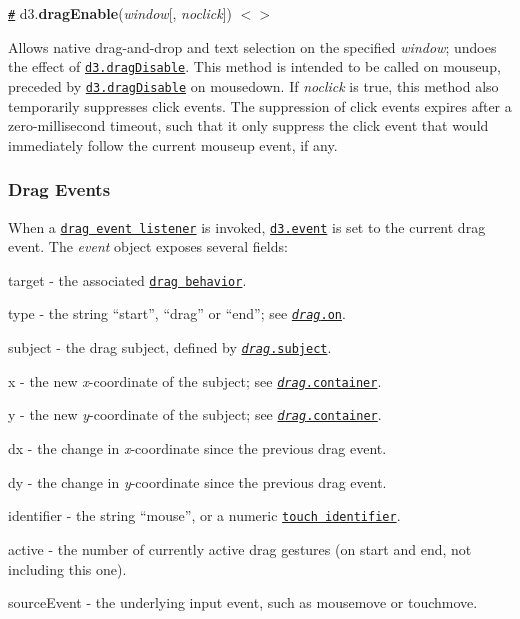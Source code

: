 \href{#dragEnable}{\tt \#} d3.{\bfseries drag\+Enable}({\itshape window}\mbox{[}, {\itshape noclick}\mbox{]}) \href{https://github.com/d3/d3-drag/blob/master/src/nodrag.js#L15}{\tt $<$$>$}

Allows native drag-\/and-\/drop and text selection on the specified {\itshape window}; undoes the effect of \href{#dragDisable}{\tt d3.\+drag\+Disable}. This method is intended to be called on mouseup, preceded by \href{#dragDisable}{\tt d3.\+drag\+Disable} on mousedown. If {\itshape noclick} is true, this method also temporarily suppresses click events. The suppression of click events expires after a zero-\/millisecond timeout, such that it only suppress the click event that would immediately follow the current mouseup event, if any.

\subsubsection*{Drag Events}

When a \href{#drag_on}{\tt drag event listener} is invoked, \href{https://github.com/d3/d3-selection#event}{\tt d3.\+event} is set to the current drag event. The {\itshape event} object exposes several fields\+:


\begin{DoxyItemize}
\item {\ttfamily target} -\/ the associated \href{#drag}{\tt drag behavior}.
\item {\ttfamily type} -\/ the string “start”, “drag” or “end”; see \href{#drag_on}{\tt {\itshape drag}.on}.
\item {\ttfamily subject} -\/ the drag subject, defined by \href{#drag_subject}{\tt {\itshape drag}.subject}.
\item {\ttfamily x} -\/ the new {\itshape x}-\/coordinate of the subject; see \href{#drag_container}{\tt {\itshape drag}.container}.
\item {\ttfamily y} -\/ the new {\itshape y}-\/coordinate of the subject; see \href{#drag_container}{\tt {\itshape drag}.container}.
\item {\ttfamily dx} -\/ the change in {\itshape x}-\/coordinate since the previous drag event.
\item {\ttfamily dy} -\/ the change in {\itshape y}-\/coordinate since the previous drag event.
\item {\ttfamily identifier} -\/ the string “mouse”, or a numeric \href{https://www.w3.org/TR/touch-events/#widl-Touch-identifier}{\tt touch identifier}.
\item {\ttfamily active} -\/ the number of currently active drag gestures (on start and end, not including this one).
\item {\ttfamily source\+Event} -\/ the underlying input event, such as mousemove or touchmove.
\end{DoxyItemize}

